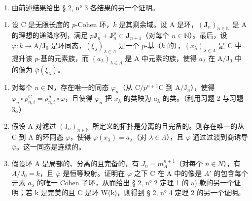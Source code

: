 \begin{enumerate}
\def\labelenumi{\alph{enumi})}
\setcounter{enumi}{3}
\tightlist
\item
  由前述结果给出 § 2, n° 3 各结果的另一个证明。
\end{enumerate}

\begin{enumerate}
\def\labelenumi{\arabic{enumi})}
\setcounter{enumi}{3}
\tightlist
\item
  设 C 是无限长度的 \(p\)-Cohen 环，\(k\) 是其剩余域。设 A 是环，\((\mathbf{J}_n)_{n \in \mathbb{N}}\) 是 A 的理想的递降序列，满足 \(p\mathbf{J}_n + \mathbf{J}_n^p \subset \mathbf{J}_{n+1}\)（对每个 \(n \in \mathbb{N}\)）。最后，设 \(\overline{\varphi}: k \to \mathrm{A} / \mathrm{J}_0\) 是环同态，\((\xi_\lambda)_{\lambda \in \Lambda}\) 是一个 \(p\)-基（\(k\) 的），\((x_\lambda)_{\lambda \in \Lambda}\) 是 C 中提升该 \(p\)-基的元素族，而 \((a_\lambda)_{\lambda \in \Lambda}\) 是 A 中元素的族，使得 \(a_\lambda\) 在 \(\mathrm{A} / \mathrm{J}_0\) 中的像为 \(\overline{\varphi}(\xi_\lambda)\)。
\end{enumerate}

\begin{enumerate}
\def\labelenumi{\alph{enumi})}
\item
  对每个 \(n\in\mathbf{N}\)，存在唯一的同态 \(\varphi_{n}\)（从 \(\mathrm{C}/p^{n+1}\mathrm{C}\) 到 \(\mathrm{A}/\mathrm{J}_{n}\)），使得 \(\varphi_{n}\circ\rho_{n,i}^{\mathrm{C}}=\rho_{n,i}^{\mathrm{A}}\circ\overline{\varphi}\)，且使得 \(\varphi_{n}\) 把 \(x_{\lambda}\) 的类映为 \(a_{\lambda}\) 的类。（利用习题 2 与习题 3。）
\item
  假设 A 对滤过 \((\mathrm{J}_{n})_{n\in\mathbb{N}}\) 所定义的拓扑是分离的且完备的。则存在唯一的从 C 到 A 的环同态 \(\varphi\)，使得 \(\varphi(x_{\lambda}) = a_{\lambda}\)（对 \(\lambda \in \Lambda\)），且 \(\varphi\) 通过过渡到商诱导 \(\overline{\varphi}\)。这一同态是连续的。
\item
  假设环 A 是局部的、分离的且完备的，有 \(J_{n} = m_{A}^{n+1}\)（对每个 \(n \in N\)），有 \(A/J_{0} = k\)，且 \(\overline{\varphi}\) 是恒等映射。证明在 \(\varphi\) 之下 C 在 A 中的像是 \(A'\) 的包含每个元素 \(a_{\lambda}\) 的唯一 Cohen 子环，从而给出 § 2, n° 2 定理 1 的 a) 款的另一个证明；若 k 是完美的且 C 是环 W(k)，则得到 § 2, n° 4 定理 2 的另一个证明。
\end{enumerate}

